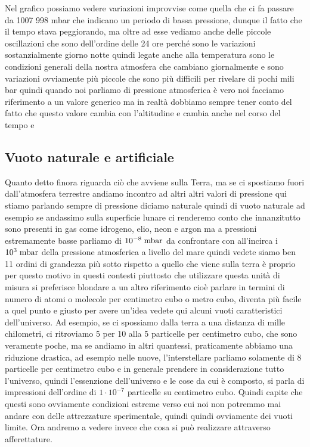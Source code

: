 Nel grafico possiamo vedere variazioni improvvise come quella che ci fa passare da 1007 998 mbar che indicano un periodo di bassa pressione, dunque il fatto che il tempo stava peggiorando, ma oltre ad esse vediamo anche delle piccole oscillazioni che sono dell'ordine delle 24 ore perché sono le variazioni sostanzialmente giorno notte quindi legate anche alla temperatura sono le condizioni generali della nostra atmosfera che cambiano giornalmente e sono variazioni ovviamente più piccole che sono più difficili per rivelare di pochi mili bar quindi quando noi parliamo di pressione atmosferica è vero noi facciamo riferimento a un valore generico ma in realtà dobbiamo sempre tener conto del fatto che questo valore cambia con l'altitudine e cambia anche nel corso del tempo e
\subsection{Vuoto naturale e artificiale}
Quanto detto finora riguarda ciò che avviene sulla Terra, ma se ci spostiamo fuori dall'atmosfera terrestre andiamo incontro ad altri altri valori di pressione qui stiamo parlando sempre di pressione diciamo naturale quindi di vuoto naturale ad esempio se andassimo sulla superficie lunare ci renderemo conto che innanzitutto sono presenti in gas come idrogeno, elio, neon e argon ma a pressioni estremamente basse parliamo di $10^{-8} \rm \; mbar$ da confrontare con all'incirca i $10^3 \rm \; mbar$ della pressione atmosferica a livello del mare quindi vedete siamo ben 11 ordini di grandezza più sotto rispetto a quello che viene sulla terra è proprio per questo motivo in questi contesti piuttosto che utilizzare questa unità di misura si preferisce blondare a un altro riferimento cioè parlare in termini di numero di atomi o molecole per centimetro cubo o metro cubo, diventa più facile a quel punto e giusto per avere un'idea vedete qui alcuni vuoti caratteristici dell'universo. Ad esempio, se ci spossiamo dalla terra a una distanza di mille chilometri, ci ritroviamo 5 per 10 alla 5 particelle per centimetro cubo, che sono veramente poche, ma se andiamo in altri quantessi, praticamente abbiamo una riduzione drastica, ad esempio nelle nuove, l'interstellare parliamo solamente di 8 particelle per centimetro cubo e in generale prendere in considerazione tutto l'universo, quindi l'essenzione dell'universo e le cose da cui è composto, si parla di impressioni dell'ordine di $1 \cdot 10^{-7}$ particelle su centimetro cubo. Quindi capite che questi sono ovviamente condizioni estreme verso cui noi non potremmo mai andare con delle attrezzature sperimentale, quindi quindi ovviamente dei vuoti limite. Ora andremo a vedere invece che cosa si può realizzare attraverso afferettature.

